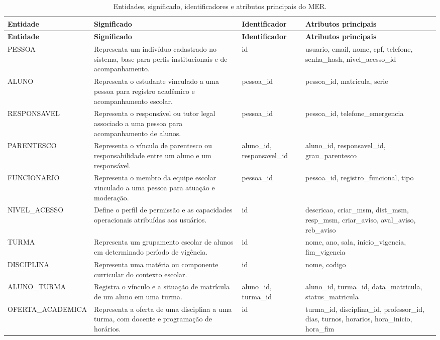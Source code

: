 \documentclass[a4paper,12pt]{report}
\begin{document}
\begin{longtable}{|p{3.0cm}|p{3.8cm}|p{2.3cm}|p{5.5cm}|}
\caption{Entidades, significado, identificadores e atributos principais do MER.} \label{tab:mer-entidades} \\
\hline
\textbf{Entidade} & \textbf{Significado} & \textbf{Identificador} & \textbf{Atributos principais} \\
\hline
\endfirsthead
\hline
\textbf{Entidade} & \textbf{Significado} & \textbf{Identificador} & \textbf{Atributos principais} \\
\hline
\endhead
PESSOA & Representa um indivíduo cadastrado no sistema, base para perfis institucionais e de acompanhamento. & id & usuario, email, nome, cpf, telefone, senha\_hash, nivel\_acesso\_id \\
\hline
ALUNO & Representa o estudante vinculado a uma pessoa para registro acadêmico e acompanhamento escolar. & pessoa\_id & pessoa\_id, matricula, serie \\
\hline
RESPONSAVEL & Representa o responsável ou tutor legal associado a uma pessoa para acompanhamento de alunos. & pessoa\_id & pessoa\_id, telefone\_emergencia \\
\hline
PARENTESCO & Representa o vínculo de parentesco ou responsabilidade entre um aluno e um responsável. & aluno\_id, responsavel\_id & aluno\_id, responsavel\_id, grau\_parentesco \\
\hline
FUNCIONARIO & Representa o membro da equipe escolar vinculado a uma pessoa para atuação e moderação. & pessoa\_id & pessoa\_id, registro\_funcional, tipo \\
\hline
NIVEL\_ACESSO & Define o perfil de permissão e as capacidades operacionais atribuídas aos usuários. & id & descricao, criar\_msm, dist\_msm, resp\_msm, criar\_aviso, aval\_aviso, rcb\_aviso \\
\hline
TURMA & Representa um grupamento escolar de alunos em determinado período de vigência. & id & nome, ano, sala, inicio\_vigencia, fim\_vigencia \\
\hline
DISCIPLINA & Representa uma matéria ou componente curricular do contexto escolar. & id & nome, codigo \\
\hline
ALUNO\_TURMA & Registra o vínculo e a situação de matrícula de um aluno em uma turma. & aluno\_id, turma\_id & aluno\_id, turma\_id, data\_matricula, status\_matricula \\
\hline
OFERTA\_ACADEMICA & Representa a oferta de uma disciplina a uma turma, com docente e programação de horários. & id & turma\_id, disciplina\_id, professor\_id, dias, turnos, horarios, hora\_inicio, hora\_fim \\

\end{longtable}
\end{document}
